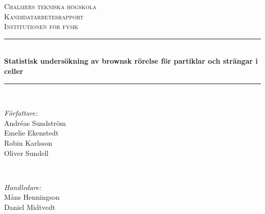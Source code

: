 
\newcommand{\andsunds}{andsunds@student.chalmers.se}
\newcommand{\emeeke}{emeeke@student.chalmers.se}
\newcommand{\robka}{robka@student.chalmers.se}
\newcommand{\soliver}{soliver@student.chalmers.se}


\renewcommand{\thefootnote}{\fnsymbol{footnote}}

\begin{titlepage}

\newcommand{\HRule}{\rule{\linewidth}{0.5mm}} %

\center %
 

\textsc{\huge Chalmers tekniska högskola}\\[1.5cm] %
\textsc{\Large Kandidatarbetesrapport}\\[0.2cm] %
\textsc{\large Institutionen för fysik }\\[0.5cm] %


\HRule \\[0.4cm]
{ \huge \bfseries 
Statistisk undersökning av brownsk rörelse för partiklar och strängar i celler 
}\\[0.4cm] 
\HRule \\[1.5cm]
 

\begin{minipage}{0.4\textwidth}
\begin{flushleft} \large
\emph{Författare:}\\
Andréas Sundström\footnotemark{} \\
Emelie Ekenstedt\footnotemark{} \\
Robin Karlsson\footnotemark{} \\
Oliver Sundell\footnotemark{}
\end{flushleft}
\end{minipage}
~
\begin{minipage}{0.4\textwidth}
\begin{flushright} \large
\emph{Handledare:} \\
Måns Henningson\\
Daniel Midtvedt
\end{flushright}
\end{minipage}\\[3cm]


\end{titlepage}

